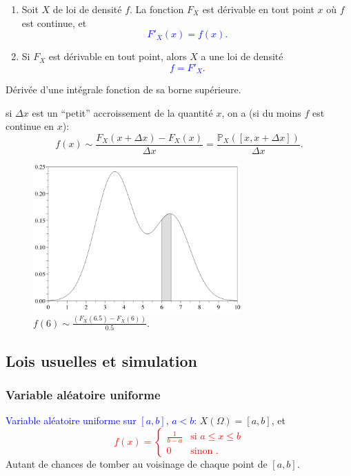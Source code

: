 \theoremstyle{proposition}
\begin{proposition}
\begin{enumerate}
\item Soit $X$ de loi de densité $f$. La fonction $F_X$ est dérivable en tout point
$x$ où $f$ est continue, et \textcolor{blue}{$$F'_{X}(x)=f(x).$$}
\item  Si $F_X$ est dérivable en tout point, alors $X$ a une loi de densité \textcolor{blue}{$$f=F'_{X}.$$}
\end{enumerate}

\end{proposition}

\begin{pruf}
Dérivée d’une intégrale fonction de sa borne supérieure.
\end{pruf}

\theoremstyle{interpretation*}
\begin{interpretation*}
si $\Delta x$  est un “petit” accroissement de la quantité $x$, on
a (si du moins $f$ est continue en $x$):
$$f(x)\sim\frac{F_X(x+\Delta x)-F_X(x)}{\Delta x}=\frac{\mathbb{P}_X([x,x+\Delta x])}{\Delta x}.$$
\begin{figure}[h]
\centering
\includegraphics[width=8cm]{content/interpretation1.PNG}
\caption{$f(6)\sim\frac{(F_X(6.5)-F_X(6))}{0.5}$.}
\end{figure}

\end{interpretation*}

\subsection{Lois usuelles et simulation}
\subsubsection{Variable aléatoire uniforme}
\textbullet \textcolor{blue}{Variable aléatoire uniforme sur $[a,b]$, $a < b$}: $X(\Omega)=[a,b]$, et
\textcolor{red}{$$f(x) = \begin{cases} \frac{1}{b-a} & \mbox{si   } a\leq x\leq b\\
                                        0 & \mbox{sinon } .\end{cases}$$}
Autant de chances de tomber au voisinage de chaque point de $[a,b]$.

